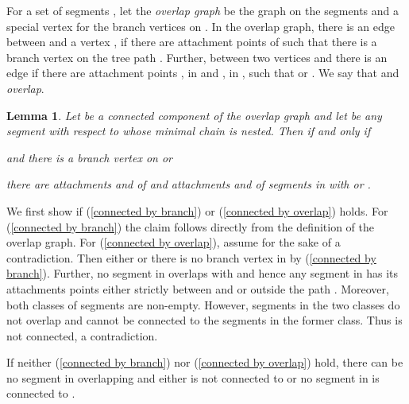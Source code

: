 \documentclass[paper=a4]{scrartcl}
\newtheorem{lemma}{Lemma}
\newcommand{\mqed}{\hfill}
\newlength{\proofpostskipamount}\newlength{\proofpreskipamount}
\newenvironment{proof}{\par\vspace{\proofpreskipamount}\noindent{\textbf{Proof:}}\hspace{0.5em}}{\nopagebreak \strut\nopagebreak \hspace{\fill}\mqed\par\vspace{\proofpostskipamount}\noindent}
\begin{document}
For a set of segments , let the \emph{overlap graph} be the graph on the segments and a special vertex  for the branch vertices on . In the overlap graph, there is an edge between  and a vertex , if there are attachment points  of  such that there is a branch vertex on the tree path . Further, between two vertices  and  there is an edge if there are attachment points ,  in  and ,  in , such that  or . We say that  and  \emph{overlap}.

\newcommand{\calC}{{\mathcal{C}}}

\begin{lemma}\label{overlap with calC suffices}
Let  be a connected component of the overlap graph  and let  be any segment with respect to  whose minimal chain  is nested. Then  if and only if
  \begin{compactenum}[(i)]
  \item \label{connected by branch}  and there is a branch vertex on  or
  \item \label{connected by overlap} there are attachments  and  of  and attachments  and  of segments in  with  or .
  \end{compactenum}
\end{lemma}
\begin{proof} We first show  if (\ref{connected by branch}) or (\ref{connected by overlap}) holds. For (\ref{connected by branch}) the claim follows directly from the definition of the overlap graph. For (\ref{connected by overlap}), assume  for the sake of a contradiction. Then either  or there is no branch vertex in  by (\ref{connected by branch}). Further, no segment in  overlaps with  and hence any segment in  has its attachments points either strictly between  and  or outside the path . Moreover, both classes of segments are non-empty. However, segments in the two classes do not overlap and  cannot be connected to the segments in the former class. Thus  is not connected, a contradiction.

If neither (\ref{connected by branch}) nor (\ref{connected by overlap}) hold, there can be no segment in  overlapping  and either  is not connected to  or no segment in  is connected to .
\end{proof}
\end{document}
